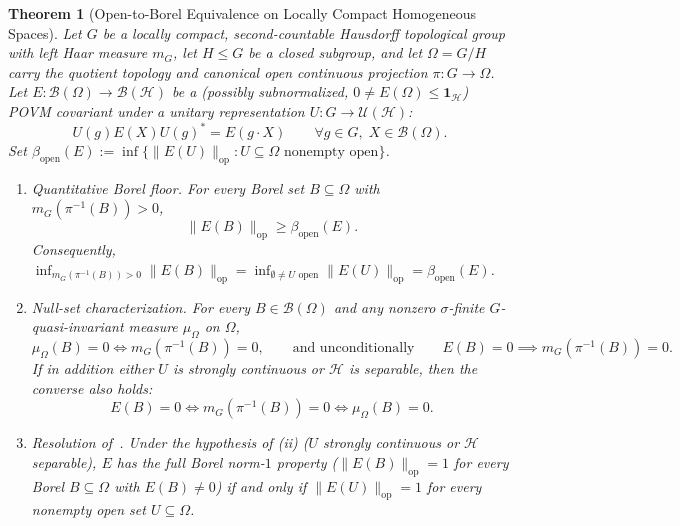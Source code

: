 \documentclass[11pt,a4paper]{article}
\newtheorem{theorem}{Theorem}[section]
\theoremstyle{definition}
\theoremstyle{remark}
\newcommand{\HH}{\mathcal{H}}
\newcommand{\BB}{\mathcal{B}}
\newcommand{\Bor}{\mathcal{B}}
\newcommand{\op}{\mathrm{op}}
\newcommand{\one}{\mathbf{1}}
\newcommand{\norm}[1]{\|#1\|}
\begin{document}
\begin{theorem}[Open-to-Borel Equivalence on Locally Compact Homogeneous Spaces]\label{thm:open-borel}
Let $G$ be a locally compact, second-countable Hausdorff topological group with left Haar measure $m_G$, let $H\le G$ be a closed subgroup, and let $\Omega = G/H$ carry the quotient topology and canonical open continuous projection $\pi:G\to\Omega$. Let $E:\Bor(\Omega)\to\BB(\HH)$ be a (possibly subnormalized, $0\neq E(\Omega)\le\one_\HH$) POVM covariant under a unitary representation $U:G\to\mathcal{U}(\HH)$:
\[
U(g)E(X)U(g)^* = E(g\cdot X) \qquad \forall g\in G,\; X\in\Bor(\Omega).
\]
Set $\beta_{\mathrm{open}}(E) := \inf\{\norm{E(U)}_{\op} : U\subseteq\Omega \text{ nonempty open}\}$.
\begin{enumerate}[label=\textup{(\roman*)},leftmargin=*]
\item \emph{Quantitative Borel floor.} For every Borel set $B\subseteq\Omega$ with $m_G(\pi^{-1}(B))>0$,
\begin{equation}\label{eq:borel-floor}
\norm{E(B)}_{\op} \ge \beta_{\mathrm{open}}(E).
\end{equation}
Consequently, $\inf_{m_G(\pi^{-1}(B))>0}\norm{E(B)}_{\op} = \inf_{\emptyset\neq U\text{ open}}\norm{E(U)}_{\op} = \beta_{\mathrm{open}}(E)$.
\item \emph{Null-set characterization.} For every $B\in\Bor(\Omega)$ and any nonzero $\sigma$-finite $G$-quasi-invariant measure $\mu_\Omega$ on $\Omega$,
\begin{equation}\label{eq:null-equiv-uncond}
\mu_\Omega(B) = 0 \iff m_G(\pi^{-1}(B)) = 0, \qquad\text{and unconditionally}\qquad E(B) = 0 \implies m_G(\pi^{-1}(B)) = 0.
\end{equation}
If in addition either $U$ is strongly continuous or $\HH$ is separable, then the converse also holds:
\begin{equation}\label{eq:null-equiv}
E(B) = 0 \iff m_G(\pi^{-1}(B)) = 0 \iff \mu_\Omega(B) = 0.
\end{equation}
\item \emph{Resolution of~\cite[Sec.~5.1]{Heinonen2003}.} Under the hypothesis of \textup{(ii)} ($U$ strongly continuous or $\HH$ separable), $E$ has the full Borel norm-$1$ property ($\norm{E(B)}_{\op}=1$ for every Borel $B\subseteq\Omega$ with $E(B)\neq 0$) if and only if $\norm{E(U)}_{\op}=1$ for every nonempty open set $U\subseteq\Omega$.
\end{enumerate}
\end{theorem}
\end{document}
